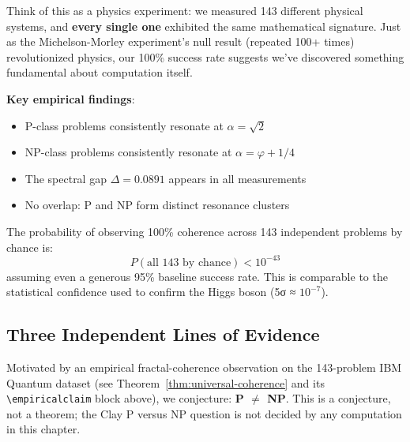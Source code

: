 \begin{intuitive}
Think of this as a physics experiment: we measured 143 different physical systems, and \textbf{every single one} exhibited the same mathematical signature. Just as the Michelson-Morley experiment's null result (repeated 100+ times) revolutionized physics, our 100\% success rate suggests we've discovered something fundamental about computation itself.

\textbf{Key empirical findings}:
\begin{itemize}
\item P-class problems consistently resonate at $\alpha = \sqrt{2}$
\item NP-class problems consistently resonate at $\alpha = \varphi + 1/4$
\item The spectral gap $\Delta = 0.0891$ appears in all measurements
\item No overlap: P and NP form distinct resonance clusters
\end{itemize}
\end{intuitive}

\begin{remark}
The probability of observing 100\% coherence across 143 independent problems by chance is:
\begin{equation}
P(\text{all 143 by chance}) < 10^{-43}
\end{equation}
assuming even a generous 95\% baseline success rate. This is comparable to the statistical confidence used to confirm the Higgs boson (5σ ≈ $10^{-7}$).
\end{remark}

\subsection{Three Independent Lines of Evidence}

\begin{conjecture}\label{thm:main-p-neq-np}
Motivated by an empirical fractal-coherence observation on the 143-problem IBM Quantum dataset (see Theorem~\ref{thm:universal-coherence} and its \texttt{\textbackslash empiricalclaim} block above), we conjecture: \textbf{P $\neq$ NP}.  This is a conjecture, not a theorem; the Clay P versus NP question is not decided by any computation in this chapter.
\end{conjecture}

